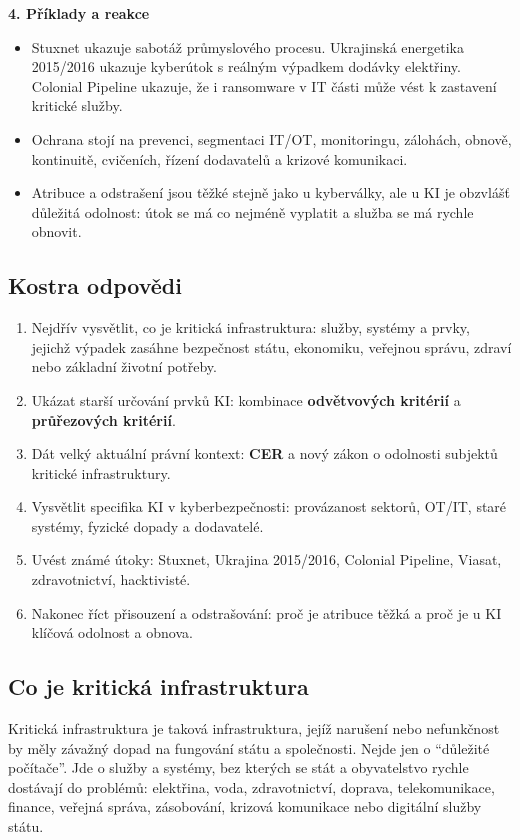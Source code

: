 \documentclass[11pt,a4paper]{article}
\begin{document}
\textbf{4. Příklady a reakce}
\begin{itemize}
  \item Stuxnet ukazuje sabotáž průmyslového procesu. Ukrajinská energetika 2015/2016 ukazuje kyberútok s reálným výpadkem dodávky elektřiny. Colonial Pipeline ukazuje, že i ransomware v IT části může vést k zastavení kritické služby.
  \item Ochrana stojí na prevenci, segmentaci IT/OT, monitoringu, zálohách, obnově, kontinuitě, cvičeních, řízení dodavatelů a krizové komunikaci.
  \item Atribuce a odstrašení jsou těžké stejně jako u kyberválky, ale u KI je obzvlášť důležitá odolnost: útok se má co nejméně vyplatit a služba se má rychle obnovit.
\end{itemize}

\subsection*{Kostra odpovědi}
\begin{enumerate}
  \item Nejdřív vysvětlit, co je kritická infrastruktura: služby, systémy a prvky, jejichž výpadek zasáhne bezpečnost státu, ekonomiku, veřejnou správu, zdraví nebo základní životní potřeby.
  \item Ukázat starší určování prvků KI: kombinace \textbf{odvětvových kritérií} a \textbf{průřezových kritérií}.
  \item Dát velký aktuální právní kontext: \textbf{CER} a nový zákon o odolnosti subjektů kritické infrastruktury.
  \item Vysvětlit specifika KI v kyberbezpečnosti: provázanost sektorů, OT/IT, staré systémy, fyzické dopady a dodavatelé.
  \item Uvést známé útoky: Stuxnet, Ukrajina 2015/2016, Colonial Pipeline, Viasat, zdravotnictví, hacktivisté.
  \item Nakonec říct přisouzení a odstrašování: proč je atribuce těžká a proč je u KI klíčová odolnost a obnova.
\end{enumerate}

\subsection*{Co je kritická infrastruktura}
Kritická infrastruktura je taková infrastruktura, jejíž narušení nebo nefunkčnost by měly závažný dopad na fungování státu a společnosti. Nejde jen o “důležité počítače”. Jde o služby a systémy, bez kterých se stát a obyvatelstvo rychle dostávají do problémů: elektřina, voda, zdravotnictví, doprava, telekomunikace, finance, veřejná správa, zásobování, krizová komunikace nebo digitální služby státu.
\end{document}
